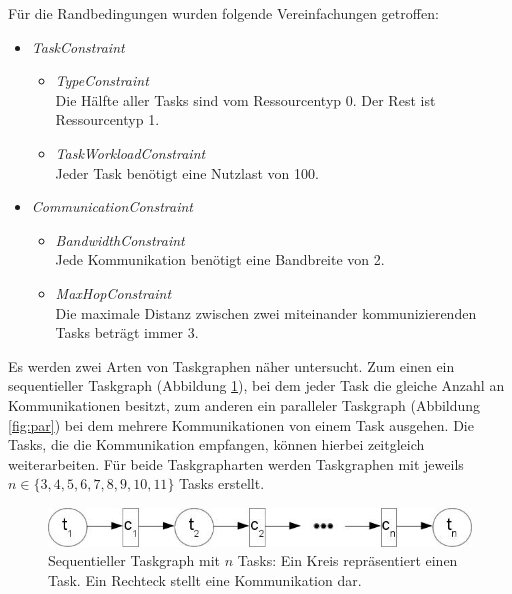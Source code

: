 Für die Randbedingungen wurden folgende Vereinfachungen getroffen:
\begin{itemize}
\item \textit{TaskConstraint}
\begin{itemize}
\item \textit{TypeConstraint}\\
Die Hälfte aller Tasks sind vom Ressourcentyp 0. Der Rest ist Ressourcentyp 1.
\item \textit{TaskWorkloadConstraint} \\
Jeder Task benötigt eine Nutzlast von 100.
\end{itemize}
\newpage
\item \textit{CommunicationConstraint}
\begin{itemize}
\item \textit{BandwidthConstraint}\\
Jede Kommunikation benötigt eine Bandbreite von 2.
\item \textit{MaxHopConstraint}\\
Die maximale Distanz zwischen zwei miteinander kommunizierenden Tasks beträgt immer 3.
\end{itemize}
\end{itemize}

Es werden zwei Arten von Taskgraphen näher untersucht. Zum einen ein sequentieller Taskgraph (Abbildung \ref{fig:seq}), bei dem jeder Task die gleiche Anzahl an Kommunikationen besitzt,  zum anderen ein paralleler Taskgraph (Abbildung \ref{fig:par}) bei dem mehrere Kommunikationen von einem Task ausgehen. Die Tasks, die die Kommunikation empfangen, können hierbei zeitgleich weiterarbeiten. Für beide Taskgrapharten werden Taskgraphen mit jeweils $n \in \{ 3, 4, 5, 6, 7, 8, 9, 10, 11\}$ Tasks erstellt.
\begin{figure}[H]\centering
  \includegraphics[width = 120mm]{bilder/sequentiell.jpg}
  \caption{Sequentieller Taskgraph mit $n$ Tasks: Ein Kreis repräsentiert einen Task. Ein Rechteck stellt eine Kommunikation dar.
  }\label{fig:seq}
\end{figure}

